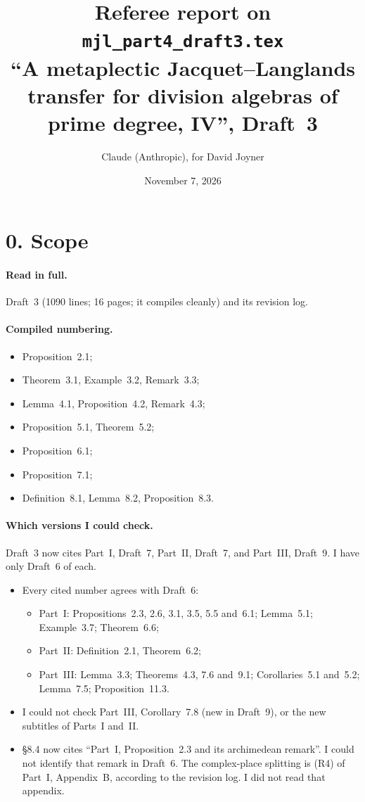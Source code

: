 \documentclass[11pt]{article}
\title{Referee report on \texttt{mjl\_part4\_draft3.tex}\\
\normalsize ``A metaplectic Jacquet--Langlands transfer for division
algebras of prime degree, IV'', Draft~3}
\author{Claude (Anthropic), for David Joyner}
\date{November 7, 2026}
\begin{document}
\maketitle

\section*{0. Scope}
\paragraph{Read in full.} Draft~3 (1090 lines; 16 pages; it compiles
cleanly) and its revision log.

\paragraph{Compiled numbering.}
\begin{itemize}
\item Proposition~2.1;
\item Theorem~3.1, Example~3.2, Remark~3.3;
\item Lemma~4.1, Proposition~4.2, Remark~4.3;
\item Proposition~5.1, Theorem~5.2;
\item Proposition~6.1;
\item Proposition~7.1;
\item Definition~8.1, Lemma~8.2, Proposition~8.3.
\end{itemize}

\paragraph{Which versions I could check.} Draft~3 now cites Part~I,
Draft~7, Part~II, Draft~7, and Part~III, Draft~9. I have only Draft~6
of each.
\begin{itemize}
\item Every cited number agrees with Draft~6:
\begin{itemize}
\item Part~I: Propositions~2.3, 2.6, 3.1, 3.5, 5.5 and~6.1; Lemma~5.1;
Example~3.7; Theorem~6.6;
\item Part~II: Definition~2.1, Theorem~6.2;
\item Part~III: Lemma~3.3; Theorems~4.3, 7.6 and~9.1; Corollaries~5.1
and~5.2; Lemma~7.5; Proposition~11.3.
\end{itemize}
\item I could not check Part~III, Corollary~7.8 (new in Draft~9), or the
new subtitles of Parts~I and~II.
\item \S8.4 now cites ``Part~I, Proposition~2.3 and its archimedean
remark''. I could not identify that remark in Draft~6. The
complex-place splitting is (R4) of Part~I, Appendix~B, according to the
revision log. I did not read that appendix.
\end{itemize}
\end{document}
